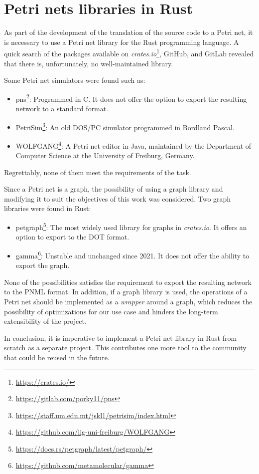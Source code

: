 \section{Petri nets libraries in Rust}

As part of the development of the translation of the source code to a Petri net,
it is necessary to use a Petri net library for the Rust programming language.
A quick search of the packages available on
\emph{crates.io}\footnote{\url{https://crates.io/}}, GitHub, and GitLab
revealed that there is, unfortunately, no well-maintained library.

Some Petri net simulators were found such as:

\begin{itemize}
    \item pns\footnote{\url{https://gitlab.com/porky11/pns}}:
          Programmed in C. It does not offer the option
          to export the resulting network to a standard format.
    \item PetriSim\footnote{\url{https://staff.um.edu.mt/jskl1/petrisim/index.html}}:
          An old DOS/PC simulator programmed in Bordland Pascal.
    \item WOLFGANG\footnote{\url{https://github.com/iig-uni-freiburg/WOLFGANG}}:
          A Petri net editor in Java, maintained by the Department of Computer Science
          at the University of Freiburg, Germany.
\end{itemize}

Regrettably, none of them meet the requirements of the task.

Since a Petri net is a graph, the possibility
of using a graph library and modifying it to suit the objectives of this work was considered.
Two graph libraries were found in Rust:

\begin{itemize}
    \item petgraph\footnote{\url{https://docs.rs/petgraph/latest/petgraph/}}:
          The most widely used library for graphs in \textit{crates.io}.
          It offers an option to export to the DOT format.
    \item gamma\footnote{\url{https://github.com/metamolecular/gamma}}:
          Unstable and unchanged since 2021. It does not offer the ability to export the graph.
\end{itemize}

None of the possibilities satisfies the requirement
to export the resulting network to the \acrshort{PNML} format.
In addition, if a graph library is used,
the operations of a Petri net should be implemented as a \emph{wrapper} around a graph,
which reduces the possibility of optimizations for our use case
and hinders the long-term extensibility of the project.

In conclusion, it is imperative
to implement a Petri net library in Rust from scratch as a separate project.
This contributes one more tool to the community that could be reused in the future.